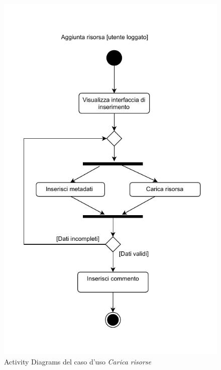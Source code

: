 \documentclass[a4paper]{article}
\begin{document}
\begin{figure}[H]
    \centering
    \includegraphics{./figures/aggiungi_risorsa_ac}
    \caption{Activity Diagrams del caso d'uso \textit{Carica risorse}}
    \label{fig:ac_valuta_registrazione_utenti}
\end{figure}
\end{document}
